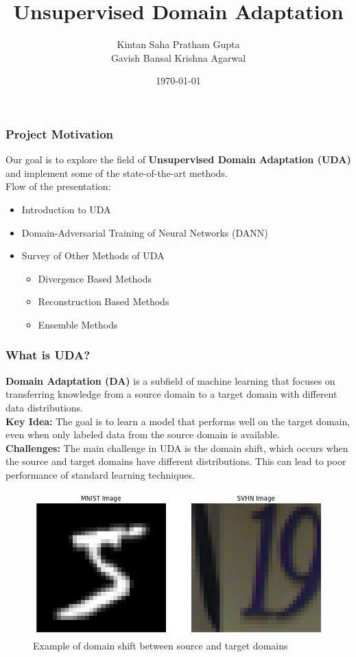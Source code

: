 \documentclass{beamer}
\title{Unsupervised Domain Adaptation}
\author{Kintan Saha \hspace{} Pratham Gupta \\
    Gavish Bansal \hspace{} Krishna Agarwal }
\institute{Indian Institute of Science, Bangalore}
\date{\today}
\begin{document}
\frame{\titlepage}

\begin{frame}
    \frametitle{Project Motivation}
    Our goal is to explore the field of \textbf{Unsupervised Domain Adaptation (UDA)} and implement some of the state-of-the-art methods.\\
    Flow of the presentation:
    \begin{itemize}
        \item Introduction to UDA
        \item Domain-Adversarial Training of Neural Networks (DANN)
        \item Survey of Other Methods of UDA
        \begin{itemize}
            \item Divergence Based Methods
            \item Reconstruction Based Methods
            \item Ensemble Methods
        \end{itemize}
    \end{itemize}    

\end{frame}

\begin{frame}
    \frametitle{What is UDA?}
    \textbf{Domain Adaptation (DA)} is a subfield of machine learning that focuses on transferring knowledge from a source domain to a target domain with different data distributions.\\
    \textbf{Key Idea:} The goal is to learn a model that performs well on the target domain, even when only labeled data from the source domain is available.\\
    \textbf{Challenges:} The main challenge in UDA is the domain shift, which occurs when the source and target domains have different distributions. This can lead to poor performance of standard learning techniques.\\
    \begin{figure}
        \centering
        \includegraphics[width=0.5\linewidth]{Example of Domain Shift.png}
        \caption{Example of domain shift between source and target domains}
    \end{figure}
\end{frame}
\end{document}
